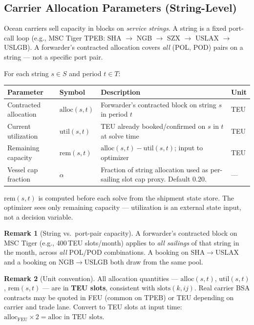 \documentclass[11pt,a4paper]{article}
\theoremstyle{definition}
\newtheorem{remark}{Remark}
\begin{document}
\subsection{Carrier Allocation Parameters (String-Level)}
\label{sec:alloc-params}

Ocean carriers sell capacity in blocks on \emph{service strings}. A string is a fixed port-call
loop (e.g., MSC Tiger TPEB: SHA $\to$ NGB $\to$ SZX $\to$ USLAX $\to$ USLGB). A forwarder's
contracted allocation covers \emph{all} (POL, POD) pairs on a string — not a specific port pair.

For each string $s \in S$ and period $t \in T$:

\begin{center}
\begin{tabular}{llp{6cm}l}
\toprule
Parameter & Symbol & Description & Unit \\
\midrule
Contracted allocation & $\text{alloc}(s,t)$ & Forwarder's contracted block on string $s$ in period $t$ & TEU \\
Current utilization & $\text{util}(s,t)$ & TEU already booked/confirmed on $s$ in $t$ at solve time & TEU \\
Remaining capacity & $\text{rem}(s,t)$ & $\text{alloc}(s,t) - \text{util}(s,t)$; input to optimizer & TEU \\
Vessel cap fraction & $\alpha$ & Fraction of string allocation used as per-sailing slot cap proxy. Default $0.20$. & — \\
\bottomrule
\end{tabular}
\end{center}

$\text{rem}(s,t)$ is computed before each solve from the shipment state store. The optimizer
sees only remaining capacity — utilization is an external state input, not a decision variable.

\begin{remark}[String vs.\ port-pair capacity]
A forwarder's contracted block on MSC Tiger (e.g., 400\,TEU slots/month) applies to
\emph{all sailings} of that string in the month, across \emph{all} POL/POD combinations.
A booking on SHA$\to$USLAX and a booking on NGB$\to$USLGB both draw from the same pool.
\end{remark}

\begin{remark}[Unit convention]
All allocation quantities --- $\text{alloc}(s,t)$, $\text{util}(s,t)$, $\text{rem}(s,t)$ ---
are in \textbf{TEU slots}, consistent with $\text{slots}(k,ij)$.
Real carrier BSA contracts may be quoted in FEU (common on TPEB) or TEU depending on carrier
and trade lane. Convert to TEU slots at input time: $\text{alloc}_{\text{FEU}} \times 2 =
\text{alloc in TEU slots}$.
\end{remark}
\end{document}
